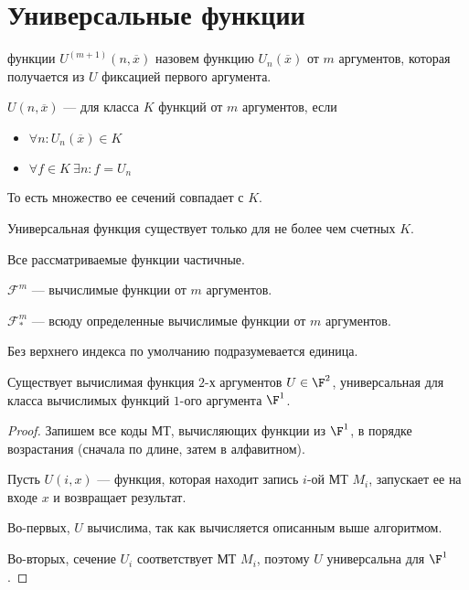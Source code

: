 \section{Универсальные функции}
\begin{defn}
	 функции $ U^{(m+1)}(n, \overline{x})$ назовем функцию $ U_n(\overline{x})$ от $ m$ аргументов, которая получается из $ U$ фиксацией первого аргумента.
\end{defn}
\begin{defn}
$ U(n, \overline{x})$ ---  для класса $ K$ функций от $ m$ аргументов, если 
	\begin{itemize}
		\item $ \forall n \colon  U_n(\overline{x}) \in K$
		\item $ \forall f \in K ~ \exists n \colon f = U_{n}$
	\end{itemize}
	То есть множество ее сечений совпадает с $ K$.
\end{defn}

\begin{note}
    Универсальная функция существует только для не более чем счетных $ K$.
\end{note}
\begin{note}
    Все рассматриваемые функции частичные.
\end{note}
\begin{name}
	$ \mathcal{F}^{m}$ --- вычислимые функции от $  m$ аргументов.

	$ \mathcal{F}^{m}_{*}$ --- всюду определенные вычислимые функции от $  m$ аргументов. 

	Без верхнего индекса по умолчанию подразумевается единица.
\end{name}

\begin{thm}\label{thm:two-args}
    Существует вычислимая функция $ 2$-х аргументов $ U \in  \F^2$, универсальная для класса вычислимых функций $ 1$-ого аргумента $ \F^{1}$.
\end{thm}
\begin{proof}
	Запишем все коды МТ, вычисляющих функции из $ \F^1$, в порядке возрастания (сначала по длине, затем в алфавитном).

	Пусть $ U(i, x)$ --- функция, которая находит запись $ i$-ой МТ $ M_i$, запускает ее на входе $ x$ и возвращает результат.

	Во-первых, $ U $  вычислима, так как вычисляется описанным выше алгоритмом.

	Во-вторых, сечение $ U_i$ соответствует МТ $ M_i$, поэтому $ U$ универсальна для $ \F^{1}$.
\end{proof}


